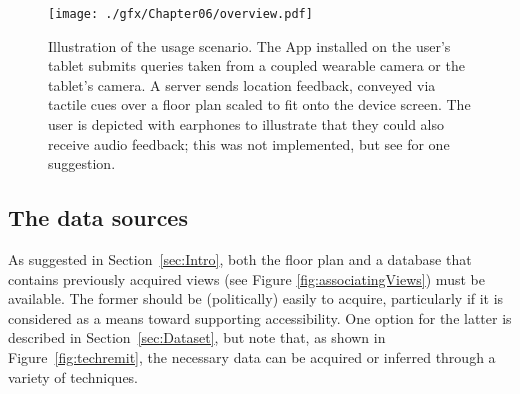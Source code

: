 \begin{figure}[h]
\centering
\texttt{[image: ./gfx/Chapter06/overview.pdf]}
\caption{Illustration of the usage scenario. The App installed on the user's tablet submits queries taken from a coupled wearable camera or the tablet's camera. A server sends location feedback, conveyed via tactile cues over a floor plan scaled to fit onto the device screen. The user is depicted with earphones to illustrate that they could also receive audio feedback; this was not implemented, but see \cite{chang2005audio} for one suggestion.}
\label{fig:overview}
\end{figure}


\subsection{The data sources} 
As suggested in Section~\ref{sec:Intro}, both the floor plan and a database that contains previously acquired views (see Figure \ref{fig:associatingViews}) must be available. The former should be (politically) easily to acquire, particularly if it is considered as a means toward supporting accessibility. One option for the latter is described in Section~\ref{sec:Dataset}, but note that, as shown in Figure~\ref{fig:techremit}, the necessary data can be acquired or inferred through a variety of techniques.  

